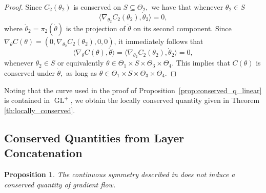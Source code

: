 \documentclass{article}
\newtheorem{prop}[theorem]{Proposition}
\theoremstyle{definition}
\DeclareMathOperator{\GL}{GL}
\begin{document}
\begin{proof}
    Since $C_2(\theta_2)$ is conserved on $S\subseteq\Theta_2,$ we have that whenever $\theta_2\in S$ 
    \begin{equation*}
        \langle\nabla_{\theta_2}C_2(\theta_2),\dot{\theta}_2\rangle=0, 
    \end{equation*}
    where $\dot{\theta}_2=\pi_2(\dot{\theta})$ is the projection of $\dot{\theta}$ on its second component. 
    Since $\nabla_\theta C(\theta)=(0,\nabla_{\theta_2}C_2(\theta_2),0,0)$, it immediately follows that 
    \begin{equation*}
        \langle\nabla_{\theta}C(\theta),\dot{\theta}\rangle=\langle\nabla_{\theta_2}C_2(\theta_2),\dot{\theta}_2\rangle=0, 
    \end{equation*} 
    whenever $\theta_2\in S$ or equivalently $\theta\in\Theta_1 \times S \times \Theta_3 \times \Theta _4$. 
    This implies that $C(\theta)$ is conserved under $\dot{\theta},$ as long as $\theta\in\Theta_1 \times S \times \Theta_3 \times \Theta _4$. 
\end{proof}
%
Noting that the curve used in the proof of Proposition~\ref{prop:conserved_q_linear} is contained in $\GL^+$, we obtain the locally conserved quantity given in Theorem \ref{th:locally_conserved}. 


\subsection{Conserved Quantities from Layer Concatenation}
\label{app:conserved_layer_concat}

\begin{prop}
The continuous symmetry described in  does not induce a conserved quantity of gradient flow. 
\end{prop}
\end{document}
